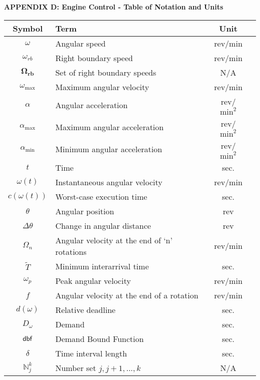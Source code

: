 
\centerline{\large\bf APPENDIX D: Engine Control - Table of Notation and Units}
\label{appendix:engCtrl-table-of-notation}

\begin{center}
\bgroup
\begin{tabular}{| c | l | c | c |}
    
    \hline			
    Symbol & Term & Unit \\  \hline \hline \cline{1-3}
    $\omega$ & Angular speed & rev/min \\ \cline{1-3}
    $\omega_{rb}$ & Right boundary speed & rev/min \\ \cline{1-3}
    $\mathbf{\Omega_{rb}}$ & Set of right boundary speeds & N/A \\ \cline{1-3}
    $\omega_{\max}$ & Maximum angular velocity & rev/min \\ \cline{1-3}
    $\alpha$ & Angular acceleration & rev/$\text{min}^2$ \\ \cline{1-3}
    $\alpha_{\max}$ & Maximum angular acceleration & rev/$\text{min}^2$ \\ \cline{1-3}
    $\alpha_{\min}$ & Minimum angular acceleration & rev/$\text{min}^2$ \\ \cline{1-3}
    $t$ & Time & sec. \\ \cline{1-3}
    $\omega(t)$ & Instantaneous angular velocity & rev/min \\ \cline{1-3}
    $c(\omega(t))$ & Worst-case execution time & sec. \\ \cline{1-3}
    $\theta$ & Angular position & rev \\ \cline{1-3}
    $\Delta \theta$ & Change in angular distance & rev \\ \cline{1-3}
    $\Omega_n$ & Angular velocity at the end of `n' rotations & rev/min \\ \cline{1-3}
    $\tilde{T}$ & Minimum interarrival time & sec. \\ \cline{1-3}
    $\omega_p$ & Peak angular velocity & rev/min \\ \cline{1-3}
    $f$ & Angular velocity at the end of a rotation & rev/min \\ \cline{1-3}
    $d(\omega)$ & Relative deadline & sec. \\ \cline{1-3}
    $D_\omega$ & Demand & sec. \\ \cline{1-3}
    $\mbox{\sf dbf}$ & Demand Bound Function & sec. \\ \cline{1-3}
    $\delta$ & Time interval length & sec. \\ \cline{1-3}
    $\mathbb{N}_j^k$ & Number set ${j, j+1, ... , k}$& N/A \\ \cline{1-3}
    \hline  
\end{tabular}
\egroup
\end{center}

